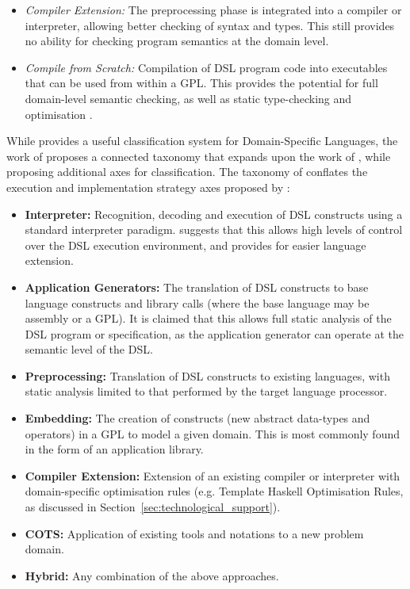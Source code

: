 \begin{itemize}
\begin{itemize}
        \item \textit{Compiler Extension:} The preprocessing phase is integrated into a compiler or interpreter, allowing better checking of syntax and types.
        This still provides no ability for checking program semantics at the domain level. 
        \item \textit{Compile from Scratch:} Compilation of DSL program code into executables that can be used from within a GPL. 
        This provides the potential for full domain-level semantic checking, as well as static type-checking and optimisation \citep{van2000domain}.
    \end{itemize}
\end{itemize}

While \citet{van2000domain} provides a useful classification system for Domain-Specific Languages, the work of \citet{Mernik:2005:DDL:1118890.1118892} proposes a connected taxonomy that expands upon the work of \citet{van2000domain}, while proposing additional axes for classification.
The taxonomy of \citet{Mernik:2005:DDL:1118890.1118892} conflates the execution and implementation strategy axes proposed by \citet{van2000domain}:
\begin{itemize}
    \item \textbf{Interpreter:} Recognition, decoding and execution of DSL constructs using a standard interpreter paradigm.
    \citet{Mernik:2005:DDL:1118890.1118892} suggests that this allows high levels of control over the DSL execution environment, and provides for easier language extension.
    \item \textbf{Application Generators:} The translation of DSL constructs to base language constructs and library calls (where the base language may be assembly or a GPL). 
    It is claimed that this allows full static analysis of the DSL program or specification, as the application generator can operate at the semantic level of the DSL.
    \item \textbf{Preprocessing:} Translation of DSL constructs to existing languages, with static analysis limited to that performed by the target language processor.
    \item \textbf{Embedding:} The creation of constructs (new abstract data-types and operators) in a GPL to model a given domain.
    This is most commonly found in the form of an application library. 
    \item \textbf{Compiler Extension:} Extension of an existing compiler or interpreter with domain-specific optimisation rules (e.g. Template Haskell Optimisation Rules, as discussed in Section~\ref{sec:technological_support}).
    \item \textbf{COTS:} Application of existing tools and notations to a new problem domain. 
    \item \textbf{Hybrid:} Any combination of the above approaches. 
\end{itemize}

